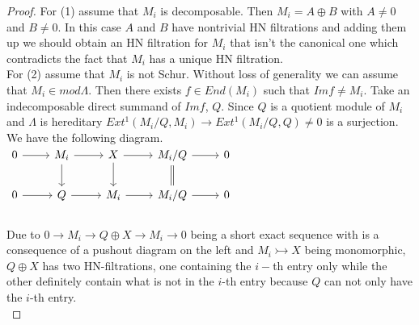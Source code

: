 \begin{proof}
\indent For (1) assume that $M_i$ is decomposable. Then $M_i = A\oplus B$ with $A\neq 0$ and $B\neq 0$. In this case $A$ and $B$ have nontrivial HN filtrations and adding them up we should obtain an HN filtration for $M_i$ that isn't the canonical one which contradicts the fact that $M_i$ has a unique HN filtration.\\
\indent For (2) assume that $M_i$ is not Schur. Without loss of generality we can assume that $M_i\in mod\Lambda$. Then there exists $f\in End(M_i)$ such that $Im f\neq M_i$. Take an indecomposable direct summand of $Im f$, $Q$. Since $Q$ is a quotient module of $M_i$ and $\Lambda$ is hereditary $Ext^1(M_i/Q, M_i)\to Ext^1(M_i/Q, Q) \neq 0$ is a surjection. We have the following diagram.\\
$\begin{tikzcd}
0\arrow[r] & M_i\arrow[r]\arrow[d] & X\arrow[r]\arrow[d] & M_i/Q \arrow[r]\arrow[d,equal] & 0\\
0\arrow[r] & Q \arrow[r] & M_i\arrow[r] & M_i/Q \arrow[r] & 0\\
\end{tikzcd}$\\
\indent Due to $0\to M_i\to Q\oplus X\to M_i\to 0$ being a short exact sequence with is a consequence of a pushout diagram on the left and $M_i\rightarrowtail X$ being monomorphic, $Q\oplus X$ has two HN-filtrations, one containing the $i-$th entry only while the other definitely contain what is not in the $i$-th entry because $Q$ can not only have the $i$-th entry.\\
\end{proof}
